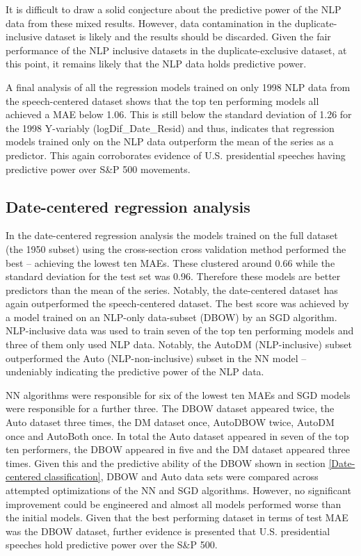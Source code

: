 \documentclass[11pt,preprint, authoryear]{elsarticle}
\numberwithin{equation}{section}
\numberwithin{figure}{section}
\numberwithin{table}{section}
\begin{document}
It is difficult to draw a solid conjecture about the predictive power of
the NLP data from these mixed results. However, data contamination in
the duplicate-inclusive dataset is likely and the results should be
discarded. Given the fair performance of the NLP inclusive datasets in
the duplicate-exclusive dataset, at this point, it remains likely that
the NLP data holds predictive power.

A final analysis of all the regression models trained on only 1998 NLP
data from the speech-centered dataset shows that the top ten performing
models all achieved a MAE below 1.06. This is still below the standard
deviation of 1.26 for the 1998 Y-variably (logDif\_Date\_Resid) and
thus, indicates that regression models trained only on the NLP data
outperform the mean of the series as a predictor. This again
corroborates evidence of U.S. presidential speeches having predictive
power over S\&P 500 movements.

\hypertarget{date-centered-regression-analysis}{%
\subsection{Date-centered regression
analysis}\label{date-centered-regression-analysis}}

In the date-centered regression analysis the models trained on the full
dataset (the 1950 subset) using the cross-section cross validation
method performed the best -- achieving the lowest ten MAEs. These
clustered around 0.66 while the standard deviation for the test set was
0.96. Therefore these models are better predictors than the mean of the
series. Notably, the date-centered dataset has again outperformed the
speech-centered dataset. The best score was achieved by a model trained
on an NLP-only data-subset (DBOW) by an SGD algorithm. NLP-inclusive
data was used to train seven of the top ten performing models and three
of them only used NLP data. Notably, the AutoDM (NLP-inclusive) subset
outperformed the Auto (NLP-non-inclusive) subset in the NN model --
undeniably indicating the predictive power of the NLP data.

NN algorithms were responsible for six of the lowest ten MAEs and SGD
models were responsible for a further three. The DBOW dataset appeared
twice, the Auto dataset three times, the DM dataset once, AutoDBOW
twice, AutoDM once and AutoBoth once. In total the Auto dataset appeared
in seven of the top ten performers, the DBOW appeared in five and the DM
dataset appeared three times. Given this and the predictive ability of
the DBOW shown in section \ref{Date-centered classification}, DBOW and
Auto data sets were compared across attempted optimizations of the NN
and SGD algorithms. However, no significant improvement could be
engineered and almost all models performed worse than the initial
models. Given that the best performing dataset in terms of test MAE was
the DBOW dataset, further evidence is presented that U.S. presidential
speeches hold predictive power over the S\&P 500.
\end{document}
